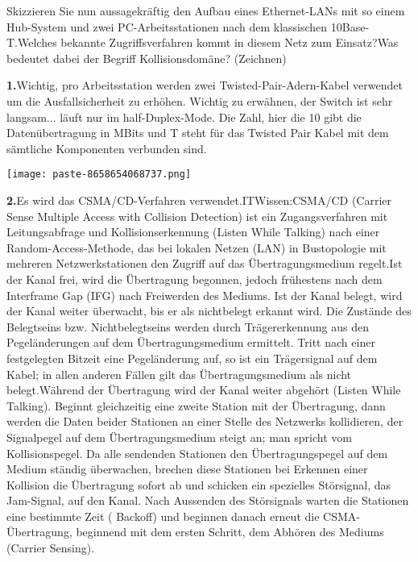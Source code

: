 \documentclass{article}
\begin{document}
\begin{tcolorbox}[colback=white!10!white,colframe=lightgray!75!black,
  savelowerto=\jobname_ex.tex,breakable,enhanced,lines before break=40]

\justifying
Skizzieren Sie nun aussagekräftig den Aufbau eines Ethernet-LANs mit so einem Hub-System und zwei PC-Arbeitsstationen nach dem klassischen 10Base-T.Welches bekannte Zugriffsverfahren kommt in diesem Netz zum Einsatz?Was bedeutet dabei der Begriff Kollisionsdomäne? (Zeichnen)

\tcblower

\justifying
\textbf{1.}Wichtig, pro Arbeitsstation werden zwei Twisted-Pair-Adern-Kabel verwendet um die Ausfallsicherheit zu erhöhen. Wichtig zu erwähnen, der Switch ist sehr langsam... läuft nur im half-Duplex-Mode. Die Zahl, hier die 10 gibt die Datenübertragung in MBits und T steht für das Twisted Pair Kabel mit dem sämtliche Komponenten verbunden sind.\begin{center}
\texttt{[image: paste-8658654068737.png]}
\end{center}
\textbf{2.}Es wird das CSMA/CD-Verfahren verwendet.ITWissen:CSMA/CD (Carrier Sense Multiple Access with Collision Detection) ist ein Zugangsverfahren mit Leitungsabfrage und Kollisionserkennung (Listen While Talking) nach einer Random-Access-Methode, das bei lokalen Netzen (LAN) in Bustopologie mit mehreren Netzwerkstationen den Zugriff auf das Übertragungsmedium regelt.Ist der Kanal frei, wird die Übertragung begonnen, jedoch frühestens nach dem Interframe Gap (IFG) nach Freiwerden des Mediums. Ist der Kanal belegt, wird der Kanal weiter überwacht, bis er als nichtbelegt erkannt wird. Die Zustände des Belegtseins bzw. Nichtbelegtseins werden durch Trägererkennung aus den Pegeländerungen auf dem Übertragungsmedium ermittelt. Tritt nach einer festgelegten Bitzeit eine Pegeländerung auf, so ist ein Trägersignal auf dem Kabel; in allen anderen Fällen gilt das Übertragungsmedium als nicht belegt.Während der Übertragung wird der Kanal weiter abgehört (Listen While Talking). Beginnt gleichzeitig eine zweite Station mit der Übertragung, dann werden die Daten beider Stationen an einer Stelle des Netzwerks kollidieren, der Signalpegel auf dem Übertragungsmedium steigt an; man spricht vom Kollisionspegel. Da alle sendenden Stationen den Übertragungspegel auf dem Medium ständig überwachen, brechen diese Stationen bei Erkennen einer Kollision die Übertragung sofort ab und schicken ein spezielles Störsignal, das Jam-Signal, auf den Kanal. Nach Aussenden des Störsignals warten die Stationen eine bestimmte Zeit ( Backoff) und beginnen danach erneut die CSMA-Übertragung, beginnend mit dem ersten Schritt, dem Abhören des Mediums (Carrier Sensing).\begin{center}

\end{center}
\end{tcolorbox}
\end{document}
